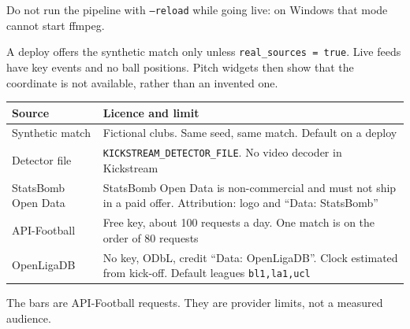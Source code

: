 \documentclass[11pt]{article}
\begin{document}
Do not run the pipeline with \texttt{--reload} while going live: on Windows that
mode cannot start ffmpeg.

A deploy offers the synthetic match only unless \texttt{real\_sources = true}.
Live feeds have key events and no ball positions.
Pitch widgets then show that the coordinate is not available, rather than an invented one.

\begin{tabularx}{\textwidth}{@{}lX@{}}
\toprule
Source & Licence and limit \\
\midrule
Synthetic match & Fictional clubs. Same seed, same match. Default on a deploy \\
Detector file & \texttt{KICKSTREAM\_DETECTOR\_FILE}. No video decoder in Kickstream \\
StatsBomb Open Data & StatsBomb Open Data is non-commercial and must not ship in a paid offer. Attribution: logo and ``Data: StatsBomb'' \\
API-Football & Free key, about 100 requests a day. One match is on the order of 80 requests \\
OpenLigaDB & No key, ODbL, credit ``Data: OpenLigaDB''. Clock estimated from kick-off. Default leagues \texttt{bl1,la1,ucl} \\
\bottomrule
\end{tabularx}

The bars are API-Football requests. They are provider limits, not a measured audience.

\begin{center}
\end{center}
\end{document}
